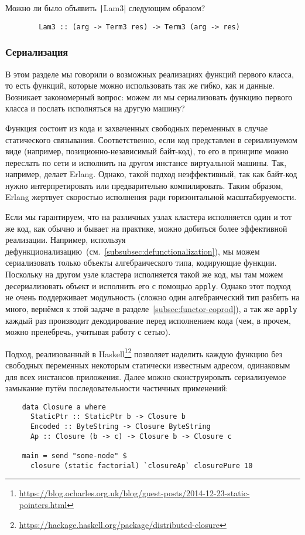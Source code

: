 \begin{task}
    Можно ли было объявить \texttt|Lam3| следующим образом?
    \begin{verbatim}
        Lam3 :: (arg -> Term3 res) -> Term3 (arg -> res)
    \end{verbatim}
\end{task}

\subsubsection{Сериализация}

В этом разделе мы говорили о возможных реализациях функций первого класса, то есть функций, которые можно использовать так же гибко, как и данные.
Возникает закономерный вопрос: можем ли мы сериализовать функцию первого класса и послать исполняться на другую машину?

Функция состоит из кода и захваченных свободных переменных в случае статического связывания.
Соответственно, если код представлен в сериализуемом виде (например, позиционно-независимый байт-код), то его в принципе можно переслать по сети и исполнить на другом инстансе виртуальной машины.
Так, например, делает Erlang.
Однако, такой подход неэффективный, так как байт-код нужно интерпретировать или предварительно компилировать.
Таким образом, Erlang жертвует скоростью исполнения ради горизонтальной масштабируемости.

Если мы гарантируем, что на различных узлах кластера исполняется один и тот же код, как обычно и бывает на практике, можно добиться более эффективной реализации.
Например, используя дефункционализацию~(см.~\ref{subsubsec:defunctionalization}), мы можем сериализовать только объекты алгебраического типа, кодирующие функции.
Поскольку на другом узле кластера исполняется такой же код, мы там можем десериализовать объект и исполнить его с помощью \texttt{apply}.
Однако этот подход не очень поддерживает модульность (сложно один алгебраический тип разбить на много, вернёмся к этой задаче в разделе~\ref{subsec:functor-coprod}), а так же \texttt{apply} каждый раз производит декодирование перед исполнением кода (чем, в прочем, можно пренебречь, учитывая работу с сетью).

Подход, реализованный в Haskell\footnote{\url{https://blog.ocharles.org.uk/blog/guest-posts/2014-12-23-static-pointers.html}}\footnote{\url{https://hackage.haskell.org/package/distributed-closure}} позволяет наделить каждую функцию без свободных переменных некоторым статически известным адресом, одинаковым для всех инстансов приложения.
Далее можно сконструировать сериализуемое замыкание путём последовательности частичных применений:
\begin{verbatim}
    data Closure a where
      StaticPtr :: StaticPtr b -> Closure b
      Encoded :: ByteString -> Closure ByteString
      Ap :: Closure (b -> c) -> Closure b -> Closure c

    main = send "some-node" $
      closure (static factorial) `closureAp` closurePure 10
\end{verbatim}

